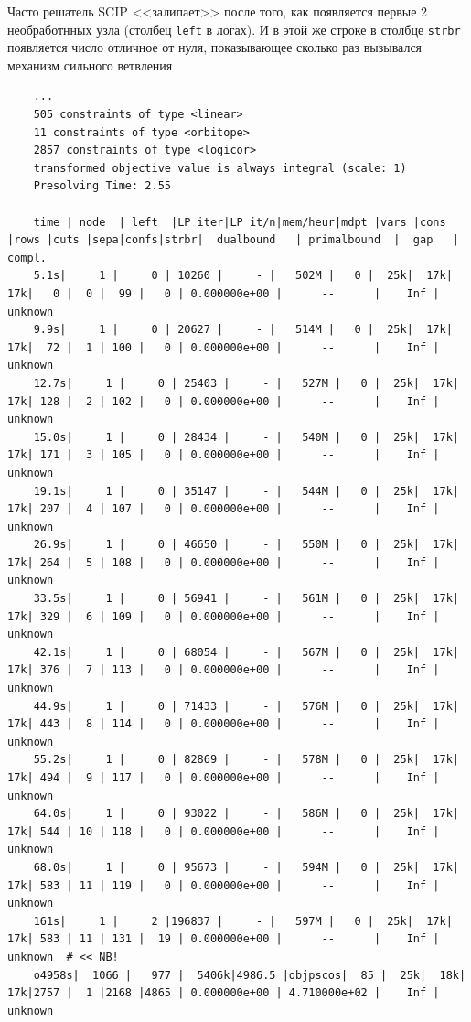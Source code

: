 \documentclass[%
	11pt,
	a4paper,
	utf8,
		]{article}
\begin{document}
Часто решатель SCIP <<залипает>> после того, как появляется первые 2 необработнных узла (столбец \texttt{left} в логах). И в этой же строке в столбце \texttt{strbr} появляется число отличное от нуля, показывающее сколько раз вызывался механизм сильного ветвления
\begin{lstlisting}
	...
	505 constraints of type <linear>
	11 constraints of type <orbitope>
	2857 constraints of type <logicor>
	transformed objective value is always integral (scale: 1)
	Presolving Time: 2.55
	
	time | node  | left  |LP iter|LP it/n|mem/heur|mdpt |vars |cons |rows |cuts |sepa|confs|strbr|  dualbound   | primalbound  |  gap   | compl. 
	5.1s|     1 |     0 | 10260 |     - |   502M |   0 |  25k|  17k|  17k|   0 |  0 |  99 |   0 | 0.000000e+00 |      --      |    Inf | unknown
	9.9s|     1 |     0 | 20627 |     - |   514M |   0 |  25k|  17k|  17k|  72 |  1 | 100 |   0 | 0.000000e+00 |      --      |    Inf | unknown
	12.7s|     1 |     0 | 25403 |     - |   527M |   0 |  25k|  17k|  17k| 128 |  2 | 102 |   0 | 0.000000e+00 |      --      |    Inf | unknown
	15.0s|     1 |     0 | 28434 |     - |   540M |   0 |  25k|  17k|  17k| 171 |  3 | 105 |   0 | 0.000000e+00 |      --      |    Inf | unknown
	19.1s|     1 |     0 | 35147 |     - |   544M |   0 |  25k|  17k|  17k| 207 |  4 | 107 |   0 | 0.000000e+00 |      --      |    Inf | unknown
	26.9s|     1 |     0 | 46650 |     - |   550M |   0 |  25k|  17k|  17k| 264 |  5 | 108 |   0 | 0.000000e+00 |      --      |    Inf | unknown
	33.5s|     1 |     0 | 56941 |     - |   561M |   0 |  25k|  17k|  17k| 329 |  6 | 109 |   0 | 0.000000e+00 |      --      |    Inf | unknown
	42.1s|     1 |     0 | 68054 |     - |   567M |   0 |  25k|  17k|  17k| 376 |  7 | 113 |   0 | 0.000000e+00 |      --      |    Inf | unknown
	44.9s|     1 |     0 | 71433 |     - |   576M |   0 |  25k|  17k|  17k| 443 |  8 | 114 |   0 | 0.000000e+00 |      --      |    Inf | unknown
	55.2s|     1 |     0 | 82869 |     - |   578M |   0 |  25k|  17k|  17k| 494 |  9 | 117 |   0 | 0.000000e+00 |      --      |    Inf | unknown
	64.0s|     1 |     0 | 93022 |     - |   586M |   0 |  25k|  17k|  17k| 544 | 10 | 118 |   0 | 0.000000e+00 |      --      |    Inf | unknown
	68.0s|     1 |     0 | 95673 |     - |   594M |   0 |  25k|  17k|  17k| 583 | 11 | 119 |   0 | 0.000000e+00 |      --      |    Inf | unknown
	161s|     1 |     2 |196837 |     - |   597M |   0 |  25k|  17k|  17k| 583 | 11 | 131 |  19 | 0.000000e+00 |      --      |    Inf | unknown  # << NB!
	o4958s|  1066 |   977 |  5406k|4986.5 |objpscos|  85 |  25k|  18k|  17k|2757 |  1 |2168 |4865 | 0.000000e+00 | 4.710000e+02 |    Inf | unknown
\end{lstlisting}
\end{document}
